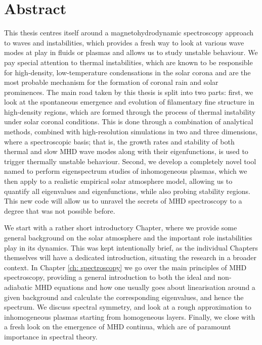 \chapter*{Abstract} \label{ch: abstract}

This thesis centres itself around a magnetohydrodynamic spectroscopy approach to waves and instabilities, which provides a fresh way to look at various wave modes at play in fluids or plasmas and allows us to study unstable behaviour. We pay special attention to thermal instabilities, which are known to be responsible for high-density, low-temperature condensations in the solar corona and are the most probable mechanism for the formation of coronal rain and solar prominences. The main road taken by this thesis is split into two parts: first, we look at the spontaneous emergence and evolution of filamentary fine structure in high-density regions, which are formed through the process of thermal instability under solar coronal conditions. This is done through a combination of analytical methods, combined with high-resolution simulations in two and three dimensions, where a spectroscopic basis; that is, the growth rates and stability of both thermal and slow MHD wave modes along with their eigenfunctions, is used to trigger thermally unstable behaviour. Second, we develop a completely novel tool named {\legolas} to perform eigenspectrum studies of inhomogeneous plasmas, which we then apply to a realistic empirical solar atmosphere model, allowing us to quantify all eigenvalues and eigenfunctions, while also probing stability regions. This new code will allow us to unravel the secrets of MHD spectroscopy to a degree that was not possible before.

We start with a rather short introductory Chapter, where we provide some general background on the solar atmosphere and the important role instabilities play in its dynamics. This was kept intentionally brief, as the individual Chapters themselves will have a dedicated introduction, situating the research in a broader context. In Chapter \ref{ch: spectroscopy} we go over the main principles of MHD spectroscopy, providing a general introduction to both the ideal and non-adiabatic MHD equations and how one usually goes about linearisation around a given background and calculate the corresponding eigenvalues, and hence the spectrum. We discuss spectral symmetry, and look at a rough approximation to inhomogeneous plasmas starting from homogeneous layers. Finally, we close with a fresh look on the emergence of MHD continua, which are of paramount importance in spectral theory.

